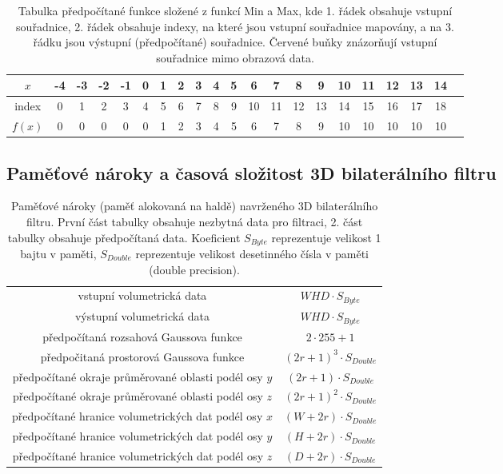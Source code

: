 \begin{table} [H]
    \centering
    \label{tab:clamp_func}
    \begin{tabular}{|c|c|c|c|c|c|c|c|c|c|c|c|c|c|c|c|c|c|c|c|c|}
        \hline
        $x$ & \cellcolor{red!25}-4 & \cellcolor{red!25}-3 & \cellcolor{red!25}-2 & \cellcolor{red!25}-1 &
        0 & 1 & 2 & 3 & 4 & 5 & 6 & 7 & 8 & 9 & 10 &
        \cellcolor{red!25}11 & \cellcolor{red!25}12 & \cellcolor{red!25}13 & \cellcolor{red!25}14\\
        \hline
        index & 0 & 1 & 2 & 3 & 4 & 5 & 6 & 7 & 8 & 9 & 10 & 11 & 12 & 13 & 14 & 15 & 16 & 17 & 18\\
        \hline
        $f(x)$ & 0 & 0 & 0 & 0 & 0 & 1 & 2 & 3 & 4 & 5 & 6 & 7 & 8 & 9 & 10 & 10 & 10 & 10 & 10\\
        \hline
    \end{tabular}
    \caption{Tabulka předpočítané funkce složené z funkcí Min a Max, kde 1. řádek obsahuje vstupní souřadnice, 2. řádek obsahuje indexy, na které jsou vstupní souřadnice mapovány, a na 3. řádku jsou výstupní (předpočítané) souřadnice. Červené buňky znázorňují vstupní souřadnice mimo obrazová data.}
\end{table}

\subsection*{Paměťové nároky a časová složitost 3D bilaterálního filtru}
\begin{table} [H]
    \centering
    \begin{tabular}{|c|c|}
        \hline
        vstupní volumetrická data & $WHD \cdot S_{Byte}$ \\
        výstupní volumetrická data & $WHD \cdot S_{Byte}$ \\
        \hline
        předpočítaná rozsahová Gaussova funkce & $2 \cdot 255 + 1$ \\
        předpočitaná prostorová Gaussova funkce & $(2r + 1)^3 \cdot S_{Double}$ \\
        předpočítané okraje průměrované oblasti podél osy $y$ & $(2r + 1) \cdot S_{Double}$ \\
        předpočítané okraje průměrované oblasti podél osy $z$ & $(2r + 1)^2 \cdot S_{Double}$ \\
        předpočítané hranice volumetrických dat podél osy $x$ & $(W + 2r) \cdot S_{Double}$ \\
        předpočítané hranice volumetrických dat podél osy $y$ & $(H + 2r) \cdot S_{Double}$ \\
        předpočítané hranice volumetrických dat podél osy $z$ & $(D + 2r) \cdot S_{Double}$ \\
        \hline
    \end{tabular}
    \caption{Paměťové nároky (paměť alokovaná na haldě) navrženého 3D bilaterálního filtru. První část tabulky obsahuje nezbytná data pro filtraci, 2. část tabulky obsahuje předpočítaná data. Koeficient $S_{Byte}$ reprezentuje velikost 1 bajtu v paměti, $S_{Double}$ reprezentuje velikost desetinného čísla v paměti (double precision).}
\end{table}


